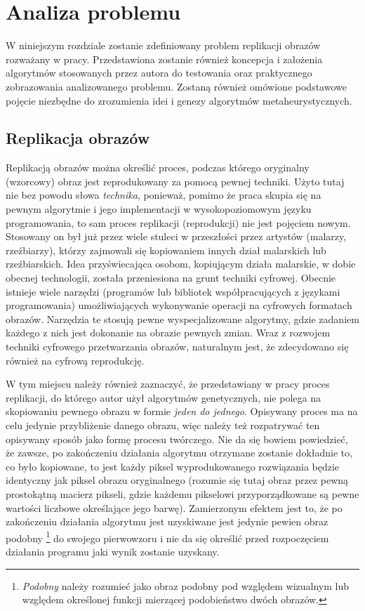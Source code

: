 \chapter{Analiza problemu}
\thispagestyle{chapterBeginStyle}
\label{rozdzial1}

W niniejszym rozdziale zostanie zdefiniowany problem replikacji obrazów rozważany w pracy. Przedstawiona zostanie również koncepcja i założenia algorytmów stosowanych przez autora do testowania oraz praktycznego zobrazowania analizowanego problemu. Zostaną również omówione podstawowe pojęcie niezbędne do zrozumienia idei i genezy algorytmów metaheurystycznych.

\section{Replikacja obrazów}
 
Replikacją obrazów można określić proces, podczas którego oryginalny (wzorcowy) obraz jest reprodukowany za pomocą pewnej techniki. Użyto tutaj nie bez powodu słowa \textit{technika}, ponieważ, pomimo że praca skupia się na pewnym algorytmie i jego implementacji w wysokopoziomowym języku programowania, to sam proces replikacji (reprodukcji) nie jest pojęciem nowym. Stosowany on był już przez wiele stuleci w przeszłości przez artystów (malarzy, rzeźbiarzy), którzy zajmowali się kopiowaniem innych dział malarskich lub rzeźbiarskich. Idea przyświecająca osobom, kopiującym działa malarskie, w dobie obecnej technologii, została przeniesiona na grunt techniki cyfrowej. Obecnie istnieje wiele narzędzi (programów lub bibliotek współpracujących z językami programowania) umożliwiających wykonywanie operacji na cyfrowych formatach obrazów. Narzędzia te stosują pewne wyspecjalizowane algorytmy, gdzie zadaniem każdego z nich jest dokonanie na obrazie pewnych zmian. Wraz z rozwojem techniki cyfrowego przetwarzania obrazów, naturalnym jest, że zdecydowano się również na cyfrową reprodukcję.

W tym miejscu należy również zaznaczyć, że przedstawiany w pracy proces replikacji, do którego autor użył algorytmów genetycznych, nie polega na skopiowaniu pewnego obrazu w formie \textit{jeden do jednego}. Opisywany proces ma na celu jedynie przybliżenie danego obrazu, więc należy też rozpatrywać ten opisywany sposób jako formę procesu twórczego. Nie da się bowiem powiedzieć, że zawsze, po zakończeniu działania algorytmu otrzymane zostanie dokładnie to, co było kopiowane, to jest każdy piksel wyprodukowanego rozwiązania będzie identyczny jak piksel obrazu oryginalnego (rozumie się tutaj obraz przez pewną prostokątną macierz pikseli, gdzie każdemu pikselowi przyporządkowane są pewne wartości liczbowe określające jego barwę). Zamierzonym efektem jest to, że po zakończeniu działania algorytmu jest uzyskiwane jest jedynie pewien obraz podobny \footnote{\textit{Podobny} należy rozumieć jako obraz podobny pod względem wizualnym lub względem określonej funkcji mierzącej podobieństwo dwóch obrazów.} do swojego pierwowzoru i nie da się określić przed rozpoczęciem działania programu jaki wynik zostanie uzyskany.

